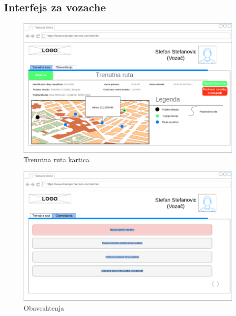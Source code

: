 \subsection{Interfejs za vozache}
\begin{figure}[H]
	\centering
	\includegraphics[scale=0.25]{Slike/KorisnickiInterfejs/Vozac/VozacTrenutnaRuta.png}
	\caption{Trenutna ruta kartica}
	\label{fig:trenutnaruta}
\end{figure}
\begin{figure}[H]
	\centering
	\includegraphics[scale=0.25]{Slike/KorisnickiInterfejs/Vozac/VozacObavestenja.drawio.png}
	\caption{Obaveshtenja}
	\label{fig:obavestenja}
\end{figure}
